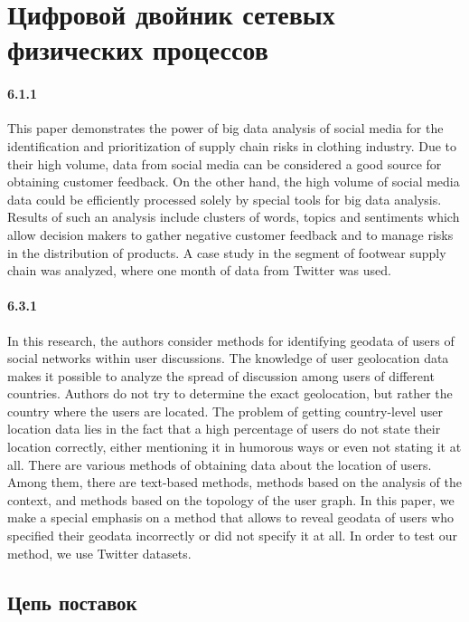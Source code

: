 \chapter{Цифровой двойник сетевых физических процессов}\label{ch:ch6}

\subsubsection{6.1.1}

This paper demonstrates the power of big data analysis of social media for the identification and prioritization of supply chain risks in clothing industry. Due to their high volume, data from social media can be considered a good source for obtaining customer feedback. On the other hand, the high volume of social media data could be efficiently processed solely by special tools for big data analysis. Results of such an analysis include clusters of words, topics and sentiments which allow decision makers to gather negative customer feedback and to manage risks in the distribution of products. A case study in the segment of footwear supply chain was analyzed, where one month of data from Twitter was used.

\subsubsection{6.3.1}

In this research, the authors consider methods for identifying geodata of users of social networks within user discussions. The knowledge of user geolocation data makes it possible to analyze the spread of discussion among users of different countries. Authors do not try to determine the exact geolocation, but rather the country where the users are located. The problem of getting country-level user location data lies in the fact that a high percentage of users do not state their location correctly, either mentioning it in humorous ways or even not stating it at all. There are various methods of obtaining data about the location of users. Among them, there are text-based methods, methods based on the analysis of the context, and methods based on the topology of the user graph. In this paper, we make a special emphasis on a method that allows to reveal geodata of users who specified their geodata incorrectly or did not specify it at all. In order to test our method, we use Twitter datasets.

\section{Цепь поставок}\label{sec:ch6/sect1}


